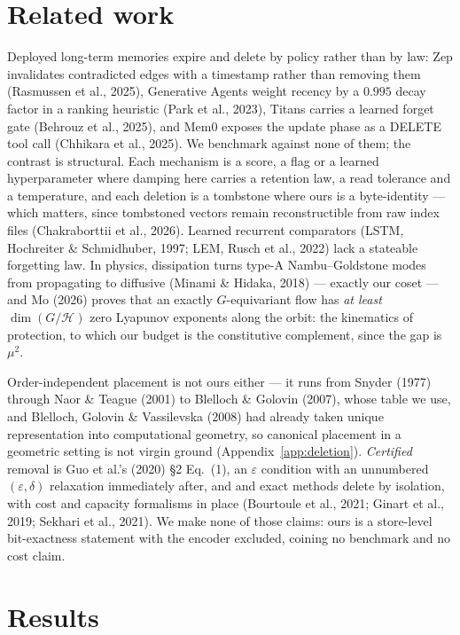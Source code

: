 \section{Related work}\label{sec:related}

{\small Deployed long-term memories expire and delete by policy rather than by law: Zep invalidates contradicted edges with a timestamp rather than removing them (Rasmussen et al., 2025), Generative Agents weight recency by a $0.995$ decay factor in a ranking heuristic (Park et al., 2023), Titans carries a learned forget gate (Behrouz et al., 2025), and Mem0 exposes the update phase as a DELETE tool call (Chhikara et al., 2025). We benchmark against none of them; the contrast is structural. Each mechanism is a score, a flag or a learned hyperparameter where damping here carries a retention law, a read tolerance and a temperature, and each deletion is a tombstone where ours is a byte-identity --- which matters, since tombstoned vectors remain reconstructible from raw index files (Chakraborttii et al., 2026). Learned recurrent comparators (LSTM, Hochreiter \& Schmidhuber, 1997; LEM, Rusch et al., 2022) lack a stateable forgetting law. In physics, dissipation turns type-A Nambu--Goldstone modes from propagating to diffusive (Minami \& Hidaka, 2018) --- exactly our coset --- and Mo (2026) proves that an exactly $G$-equivariant flow has \emph{at least} $\dim(G/\mathcal H)$ zero Lyapunov exponents along the orbit: the kinematics of protection, to which our budget is the constitutive complement, since the gap is $\mu^2$.

Order-independent placement is not ours either --- it runs from Snyder (1977) through Naor \& Teague (2001) to Blelloch \& Golovin (2007), whose table we use, and Blelloch, Golovin \& Vassilevska (2008) had already taken unique representation into computational geometry, so canonical placement in a geometric setting is not virgin ground (Appendix~\ref{app:deletion}). \emph{Certified} removal is Guo et al.'s (2020) \S2 Eq.~(1), an $\varepsilon$ condition with an unnumbered $(\varepsilon,\delta)$ relaxation immediately after, and and exact methods delete by isolation, with cost and capacity formalisms in place (Bourtoule et al., 2021; Ginart et al., 2019; Sekhari et al., 2021). We make none of those claims: ours is a store-level bit-exactness statement with the encoder excluded, coining no benchmark and no cost claim.\par}
\section{Results}\label{sec:results}

